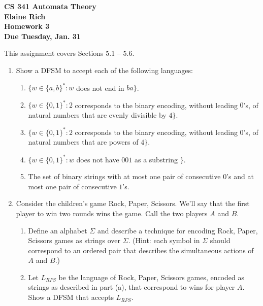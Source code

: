 \documentclass[10pt]{article}
\begin{document}
\begin{center}
\textbf{
CS 341 Automata Theory \\
Elaine Rich \\
Homework 3 \\
Due Tuesday, Jan. 31}
\end{center}
This assignment covers Sections 5.1 -- 5.6. \\

\begin{enumerate}
\addtocounter{enumi}{1}

\item
Show a DFSM to accept each of the following languages:
\begin{enumerate}

\addtocounter{enumii}{1}
\item
$\{w \in \{a, b\}^* : w$ does not end in $ba\}$.


\item
$\{w \in \{0, 1\}^* : 2$ corresponds to the binary encoding, without leading $0$'s, of natural numbers that are evenly divisible by $4\}$.

\item
$\{w \in \{0, 1\}^* : 2$ corresponds to the binary encoding, without leading $0$'s, of natural numbers that are powers of $4\}$.

\addtocounter{enumii}{2}
\item
$\{w \in \{0, 1\}^* : w$ does not have $001$ as a substring $\}.$

\addtocounter{enumii}{4}
\item
The set of binary strings with at most one pair of consecutive $0$'s and at most one pair of consecutive $1$'s.
\end{enumerate}


\item
Consider the children's game Rock, Paper, Scissors.  We'll say that the first player to win two rounds wins the game.  Call the two players $A$ and $B$.
\begin{enumerate}

\item
Define an alphabet $\Sigma$ and describe a technique for encoding Rock, Paper, Scissors games as strings over $\Sigma$. (Hint: each symbol in $\Sigma$ should correspond to an ordered pair that describes the simultaneous actions of $A$ and $B$.)

\item
Let $L_{RPS}$ be the language of Rock, Paper, Scissors games, encoded as strings as described in part (a), that correspond to wins for player $A$.  Show a DFSM that accepts $L_{RPS}$.
\end{enumerate}


\end{enumerate}
\end{document}
